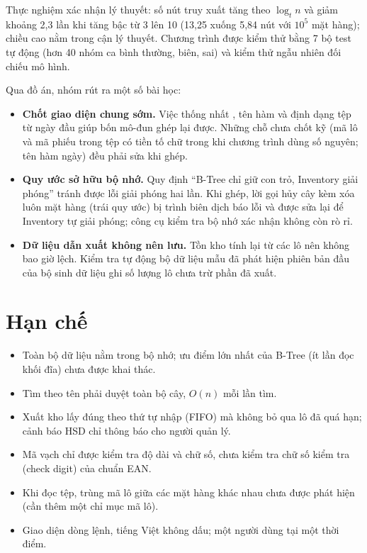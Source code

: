 Thực nghiệm xác nhận lý thuyết: số nút truy xuất tăng theo $\log_t n$ và giảm khoảng 2,3 lần khi tăng bậc từ 3
lên 10 (13,25 xuống 5,84 nút với $10^5$ mặt hàng); chiều cao nằm trong cận lý thuyết. Chương trình được kiểm thử
bằng 7 bộ test tự động (hơn 40 nhóm ca bình thường, biên, sai) và kiểm thử ngẫu nhiên đối chiếu mô hình.

Qua đồ án, nhóm rút ra một số bài học:
\begin{itemize}
  \item \textbf{Chốt giao diện chung sớm.} Việc thống nhất , tên hàm và định dạng tệp từ ngày đầu
        giúp bốn mô-đun ghép lại được. Những chỗ chưa chốt kỹ (mã lô và mã phiếu trong tệp có tiền tố chữ trong
        khi chương trình dùng số nguyên; tên hàm ngày) đều phải sửa khi ghép.
  \item \textbf{Quy ước sở hữu bộ nhớ.} Quy định ``B-Tree chỉ giữ con trỏ, Inventory giải phóng'' tránh được lỗi
        giải phóng hai lần. Khi ghép, lời gọi hủy cây kèm xóa luôn mặt hàng (trái quy ước) bị trình biên dịch báo lỗi và
        được sửa lại để Inventory tự giải phóng; công cụ kiểm tra bộ nhớ xác nhận không còn rò rỉ.
  \item \textbf{Dữ liệu dẫn xuất không nên lưu.} Tồn kho tính lại từ các lô nên không bao giờ lệch. Kiểm tra tự
        động bộ dữ liệu mẫu đã phát hiện phiên bản đầu của bộ sinh dữ liệu ghi số lượng lô chưa trừ phần đã xuất.
\end{itemize}

\section{Hạn chế}

\begin{itemize}
  \item Toàn bộ dữ liệu nằm trong bộ nhớ; ưu điểm lớn nhất của B-Tree (ít lần đọc khối đĩa) chưa được khai thác.
  \item Tìm theo tên phải duyệt toàn bộ cây, $O(n)$ mỗi lần tìm.
  \item Xuất kho lấy đúng theo thứ tự nhập (FIFO) mà không bỏ qua lô đã quá hạn; cảnh báo HSD chỉ thông báo cho
        người quản lý.
  \item Mã vạch chỉ được kiểm tra độ dài và chữ số, chưa kiểm tra chữ số kiểm tra (check digit) của chuẩn EAN.
  \item Khi đọc tệp, trùng mã lô giữa các mặt hàng khác nhau chưa được phát hiện (cần thêm một chỉ mục mã lô).
  \item Giao diện dòng lệnh, tiếng Việt không dấu; một người dùng tại một thời điểm.
\end{itemize}

